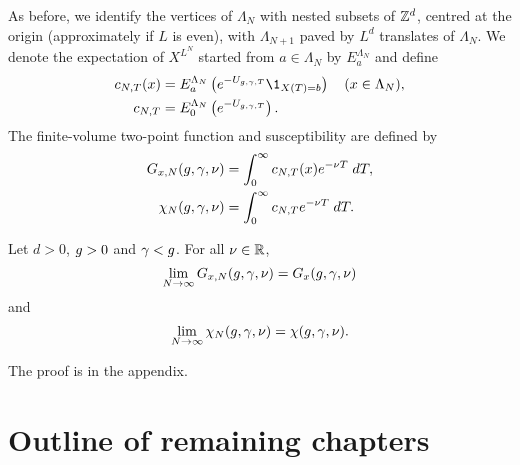 As before, we identify the vertices of $\Lambda_N$ with nested subsets of ${ {{\mathbb Z}}^d }$,
centred at the origin (approximately if $L$ is even),
with $\Lambda_{N+1}$ paved by $L^d$ translates of $\Lambda_N$.
We denote the expectation of $X^{L^N}$ started from $a \in \Lambda_N$ by $E^{\Lambda_N}_a$
and define
\begin{align}
\label{e:cN}
c_{N,T}(x)
    &= E^{\Lambda_N}_a \left( e^{-U_{\gcc,\gamma,T}} \1_{X(T)=b} \right)
    \quad (x \in \Lambda_N), \\
c_{N,T}
    &= E^{\Lambda_N}_0 \left( e^{-U_{\gcc,\gamma,T}} \right).
\end{align}
The finite-volume two-point function and susceptibility
are defined by
\begin{align}
G_{x,N}(g,\gamma,\nu)
    &=
\int_0^\infty c_{N,T}(x) e^{-\nu T} \; dT, \\
\label{e:chiNdef-pre}
\chi_N(g, \gamma, \nu)
    &=
\int_0^\infty c_{N,T} e^{-\nu T} \; dT.
\end{align}

\begin{prop}
\label{prop:finvol}
Let $d >0$, $g >0$ and $\gamma < g$. For all $\nu \in {\mathbb R}$,
\begin{equation}
\label{e:Givlc}
\lim_{N \rightarrow \infty}
G_{x,N}(g,\gamma,\nu)
=
G_x(g,\gamma,\nu)
\end{equation}
and
\begin{equation}
\label{e:chilim-pre}
\lim_{N\rightarrow\infty}\chi_N(g,\gamma,\nu) =   \chi(g,\gamma,\nu).
\end{equation}
\end{prop}

The proof is in the appendix.


\section{Outline of remaining chapters}

